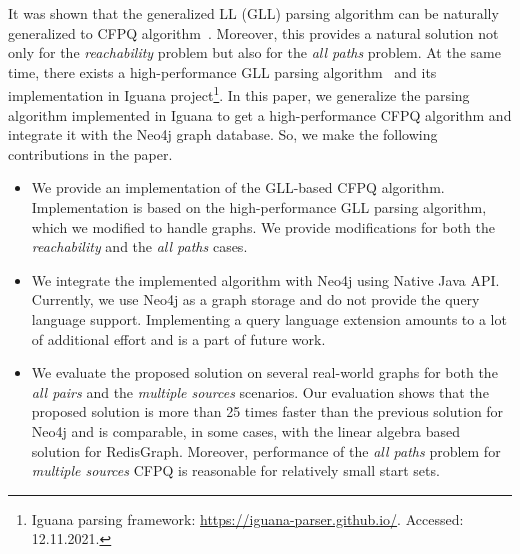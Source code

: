 It was shown that the generalized LL (GLL) parsing algorithm can be naturally generalized to CFPQ algorithm~\cite{Grigorev:2017:CPQ:3166094.3166104}. Moreover, this provides a natural solution not only for the \textit{reachability} problem but also for the \textit{all paths} problem. At the same time, there exists a high-performance GLL parsing algorithm~\cite{10.1007/978-3-662-46663-6_5} and its implementation in Iguana project\footnote{Iguana parsing framework: \url{https://iguana-parser.github.io/}. Accessed: 12.11.2021.}. In this paper, we generalize the parsing algorithm implemented in Iguana to get a high-performance CFPQ algorithm and integrate it with the Neo4j graph database. So, we make the following contributions in the paper.
\begin{itemize}
    \item We provide an implementation of the GLL-based CFPQ algorithm. Implementation is based on the high-performance GLL parsing algorithm, which we modified to handle graphs. We provide modifications for both the \textit{reachability} and the \textit{all paths} cases. 
    \item We integrate the implemented algorithm with Neo4j using Native Java API. Currently, we use Neo4j as a graph storage and do not provide the query language support. Implementing a query language extension amounts to a lot of additional effort and is a part of future work.
    \item We evaluate the proposed solution on several real-world graphs for both the \textit{all pairs} and the \textit{multiple sources} scenarios. Our evaluation shows that the proposed solution is more than 25 times faster than the previous solution for Neo4j and is comparable, in some cases, with the linear algebra based solution for RedisGraph. Moreover, performance of the \textit{all paths} problem for \textit{multiple sources} CFPQ is reasonable for relatively small start sets.
\end{itemize}